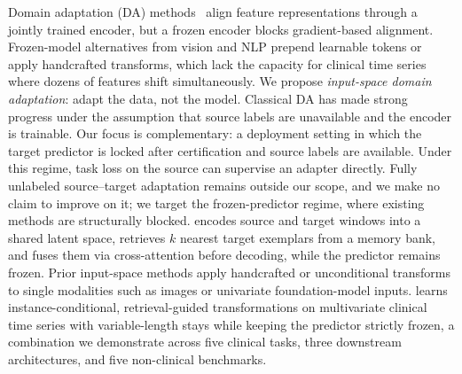 Domain adaptation (DA) methods~\citep{ganin2016dann,sun2016coral,wilson2020codats} align feature representations through a jointly trained encoder, but a frozen encoder blocks gradient-based alignment.
Frozen-model alternatives from vision and NLP \citep{jia2022vpt,qiu2026tato} prepend learnable tokens or apply handcrafted transforms, which lack the capacity for clinical time series where dozens of features shift simultaneously.
We propose \emph{input-space domain adaptation}: adapt the data, not the model.
Classical DA has made strong progress under the assumption that source labels are unavailable and the encoder is trainable. Our focus is complementary: a deployment setting in which the target predictor is locked after certification and source labels are available. Under this regime, task loss on the source can supervise an adapter directly. Fully unlabeled source--target adaptation remains outside our scope, and we make no claim to improve on it; we target the frozen-predictor regime, where existing methods are structurally blocked.
\retr{} encodes source and target windows into a shared latent space, retrieves $k$ nearest target exemplars from a memory bank, and fuses them via cross-attention before decoding, while the predictor remains frozen.
Prior input-space methods apply handcrafted or unconditional transforms to single modalities such as images or univariate foundation-model inputs. \retr{} learns instance-conditional, retrieval-guided transformations on multivariate clinical time series with variable-length stays while keeping the predictor strictly frozen, a combination we demonstrate across five clinical tasks, three downstream architectures, and five non-clinical benchmarks.

\vspace{-0.5em}
